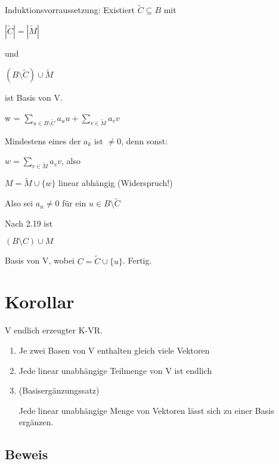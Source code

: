 \documentclass[a4paper, openany]{book}
\begin{document}
    Induktionsvorraussetzung: Existiert $\tilde{C} \subseteq B$ mit 

    \begin{center}
      $|\tilde{C}| =|\tilde{M}|$
    \end{center}

    und

    \begin{center}
      $(B \setminus \tilde{C}) \cup \tilde{M}$ 
    \end{center}

    ist Basis von V.

    w = $\sum_{u \in B \setminus \tilde{C}} a_uu+ \sum_{v \in \tilde{M}}a_v v$

    Mindestens eines der $a_k$ ist $\neq 0$, denn sonst:

    \begin{center}
      $w = \sum_{v \in \tilde{M}}a_vv$, also
    \end{center}

    $M = \tilde{M} \cup \{w\}$ linear abhängig (Widerspruch!)

    Also sei $a_n \neq 0$ für ein $u \in B \setminus \tilde{C}$

    Nach 2.19 ist 

    \begin{center}
      $(B \setminus C) \cup M$
    \end{center}

    Basis von V, wobei $C = \tilde{C} \cup \{u\}$. Fertig.

    \section{Korollar}

    V endlich erzeugter K-VR. 

    \begin{enumerate}[label=(\alph*)]
      \item Je zwei Basen von V enthalten gleich viele Vektoren
      \item Jede linear unabhängige Teilmenge von V ist endlich
      \item (Basisergänzungssatz)

      Jede linear unabhängige Menge von Vektoren lässt sich zu einer Basis ergänzen.
    \end{enumerate}

    \subsection{Beweis}
\end{document}
